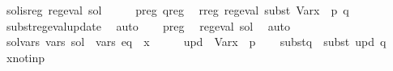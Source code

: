 \begin{isabellebody}
\isanewline
{}\isamarkupfalse%
\ sol{\isacharunderscore}{\kern0pt}is{\isacharunderscore}{\kern0pt}reg{\isacharcolon}{\kern0pt}\ {\isachardoublequoteopen}reg{\isacharunderscore}{\kern0pt}eval\ sol{\isachardoublequoteclose}\isanewline
%
\isadelimproof
%
\endisadelimproof
%
\isatagproof
{}\isamarkupfalse%
\ {\isacharminus}{\kern0pt}\isanewline
\ \ \isamarkupfalse%
\ p{\isacharunderscore}{\kern0pt}reg\ q{\isacharunderscore}{\kern0pt}reg\ \isamarkupfalse%
\ r{\isacharunderscore}{\kern0pt}reg{\isacharcolon}{\kern0pt}\ {\isachardoublequoteopen}reg{\isacharunderscore}{\kern0pt}eval\ {\isacharparenleft}{\kern0pt}subst\ {\isacharparenleft}{\kern0pt}Var{\isacharparenleft}{\kern0pt}x\ {\isacharcolon}{\kern0pt}{\isacharequal}{\kern0pt}\ p{\isacharparenright}{\kern0pt}{\isacharparenright}{\kern0pt}\ q{\isacharparenright}{\kern0pt}{\isachardoublequoteclose}\isanewline
\ \ \ \ \isamarkupfalse%
\ subst{\isacharunderscore}{\kern0pt}reg{\isacharunderscore}{\kern0pt}eval{\isacharunderscore}{\kern0pt}update\ \isamarkupfalse%
\ auto\isanewline
\ \ \isamarkupfalse%
\ p{\isacharunderscore}{\kern0pt}reg\ \isamarkupfalse%
\ {\isachardoublequoteopen}reg{\isacharunderscore}{\kern0pt}eval\ sol{\isachardoublequoteclose}\ \isamarkupfalse%
\ auto\isanewline
{}\isamarkupfalse%
%
\endisatagproof
{\isafoldproof}%
%
\isadelimproof
\isanewline
%
\endisadelimproof
\isanewline
{}\isamarkupfalse%
\ sol{\isacharunderscore}{\kern0pt}vars{\isacharcolon}{\kern0pt}\ {\isachardoublequoteopen}vars\ sol\ {\isasymsubseteq}\ vars\ eq\ {\isacharminus}{\kern0pt}\ {\isacharbraceleft}{\kern0pt}x{\isacharbraceright}{\kern0pt}{\isachardoublequoteclose}\isanewline
%
\isadelimproof
%
\endisadelimproof
%
\isatagproof
{}\isamarkupfalse%
\ {\isacharminus}{\kern0pt}\isanewline
\ \ \isamarkupfalse%
\ {\isacharquery}{\kern0pt}upd\ {\isacharequal}{\kern0pt}\ {\isachardoublequoteopen}Var{\isacharparenleft}{\kern0pt}x\ {\isacharcolon}{\kern0pt}{\isacharequal}{\kern0pt}\ p{\isacharparenright}{\kern0pt}{\isachardoublequoteclose}\isanewline
\ \ \isamarkupfalse%
\ {\isacharquery}{\kern0pt}subst{\isacharunderscore}{\kern0pt}q\ {\isacharequal}{\kern0pt}\ {\isachardoublequoteopen}subst\ {\isacharquery}{\kern0pt}upd\ q{\isachardoublequoteclose}\isanewline
\ \ \isamarkupfalse%
\ x{\isacharunderscore}{\kern0pt}not{\isacharunderscore}{\kern0pt}in{\isacharunderscore}{\kern0pt}p\ \isamarkupfalse%

\end{isabellebody}
